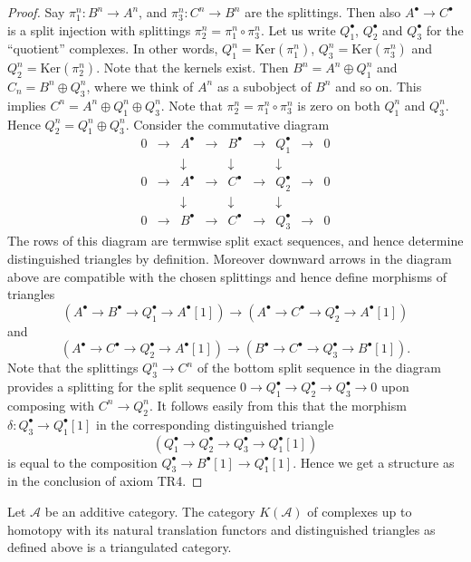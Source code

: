 \begin{proof}
Say $\pi_1^n : B^n \to A^n$, and $\pi_3^n : C^n \to B^n$ are the splittings.
Then also $A^\bullet \to C^\bullet$ is a split injection with splittings
$\pi_2^n = \pi_1^n \circ \pi_3^n$. Let us write $Q_1^\bullet$, $Q_2^\bullet$
and $Q_3^\bullet$ for the ``quotient'' complexes. In other words,
$Q_1^n = \text{Ker}(\pi_1^n)$, $Q_3^n = \text{Ker}(\pi_3^n)$ and
$Q_2^n = \text{Ker}(\pi_2^n)$. Note that the kernels exist. Then
$B^n = A^n \oplus Q_1^n$ and $C_n = B^n \oplus Q_3^n$, where we think of $A^n$
as a subobject of $B^n$ and so on. This implies
$C^n = A^n \oplus Q_1^n \oplus Q_3^n$. Note that
$\pi_2^n = \pi_1^n \circ \pi_3^n$ is zero on both $Q_1^n$ and $Q_3^n$. Hence
$Q_2^n = Q_1^n \oplus Q_3^n$. Consider the commutative diagram
$$
\begin{matrix}
0 & \to & A^\bullet & \to & B^\bullet & \to & Q_1^\bullet & \to & 0 \\
  &     & \downarrow&     & \downarrow&     & \downarrow  & \\
0 & \to & A^\bullet & \to & C^\bullet & \to & Q_2^\bullet & \to & 0 \\
  &     & \downarrow&     & \downarrow&     & \downarrow  & \\
0 & \to & B^\bullet & \to & C^\bullet & \to & Q_3^\bullet & \to & 0
\end{matrix}
$$
The rows of this diagram are termwise split exact sequences, and
hence determine distinguished triangles by
definition. Moreover downward arrows in the diagram above
are compatible with the chosen splittings and hence
define morphisms of triangles
$$
(A^\bullet \to B^\bullet \to Q_1^\bullet \to A^\bullet[1])
\longrightarrow
(A^\bullet \to C^\bullet \to Q_2^\bullet \to A^\bullet[1])
$$
and
$$
(A^\bullet \to C^\bullet \to Q_2^\bullet \to A^\bullet[1])
\longrightarrow
(B^\bullet \to C^\bullet \to Q_3^\bullet \to B^\bullet[1]).
$$
Note that the splittings $Q_3^n \to C^n$
of the bottom split sequence in the diagram provides a splitting
for the split sequence
$0 \to Q_1^\bullet \to Q_2^\bullet \to Q_3^\bullet \to 0$
upon composing with $C^n \to Q_2^n$. It follows easily from this
that the morphism $\delta : Q_3^\bullet \to Q_1^\bullet[1]$
in the corresponding distinguished triangle
$$
(Q_1^\bullet \to Q_2^\bullet \to Q_3^\bullet \to Q_1^\bullet[1])
$$
is equal to the composition $Q_3^\bullet \to B^\bullet[1] \to Q_1^\bullet[1]$.
Hence we get a structure as in the conclusion of axiom TR4.
\end{proof}

\begin{proposition}
\label{proposition-homotopy-category-triangulated}
Let $\mathcal{A}$ be an additive category.
The category $K(\mathcal{A})$ of complexes up to
homotopy with its natural translation functors
and distinguished triangles as defined above
is a triangulated category.
\end{proposition}

